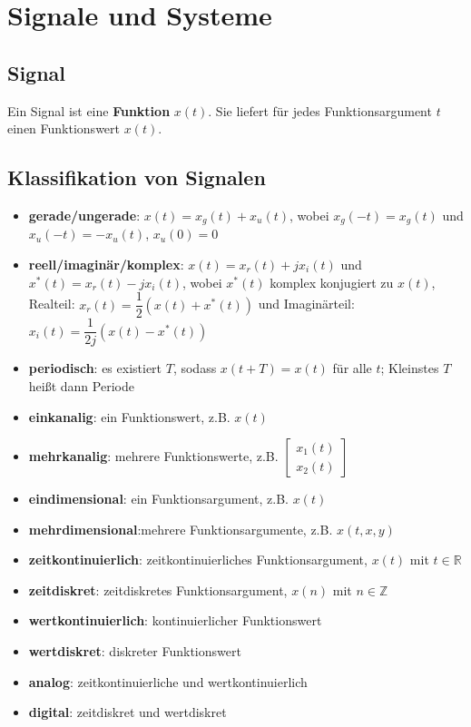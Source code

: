 \documentclass[10pt,a4paper]{article}
\author{Florian Euchner, Stefan Köbel, Chong Shen, Jan Frederik Dick}
\newcommand{\fancythumb}[2]{
	\addthumb{#1}{\large\sffamily\textbf{\space\space#1\vspace{5pt}}}{white}{#2}
}
\begin{document}
\section*{Signale und Systeme}
\fancythumb{S\&S}{teal}
\subsection*{Signal}
Ein Signal ist eine \textbf{Funktion} $x(t)$. Sie liefert für jedes Funktionsargument $t$ einen Funktionswert $x(t)$.
\subsection*{Klassifikation von Signalen}
\begin{itemize}
	\item \textbf{gerade/ungerade}: $x(t)=x_g(t)+x_u(t)$, wobei $x_g(-t)=x_g(t)$ und $x_u(-t)=-x_u(t)$, $x_u(0)=0$
	\item \textbf{reell/imaginär/komplex}: $x(t)=x_r(t)+jx_i(t)$ und $x^*(t)=x_r(t)-jx_i(t)$, wobei $x^*(t)$ komplex konjugiert zu $x(t)$, Realteil: $x_r(t)=\dfrac{1}{2}(x(t)+x^*(t))$ und Imaginärteil: $x_i(t)=\dfrac{1}{2j}(x(t)-x^*(t))$ 
	\item \textbf{periodisch}: es existiert $T$, sodass $x(t+T)=x(t)$ für alle $t$; Kleinstes $T$ heißt dann Periode
	\item \textbf{einkanalig}: ein Funktionswert, z.B. $x(t)$
	\item \textbf{mehrkanalig}: mehrere Funktionswerte, z.B.
	$\begin{bmatrix}
		x_1(t) \\ 
		x_2(t)
	\end{bmatrix}$
	\item \textbf{eindimensional}: ein Funktionsargument, z.B. $x(t)$
	\item \textbf{mehrdimensional}:mehrere Funktionsargumente, z.B. $x(t,x,y)$
	\item \textbf{zeitkontinuierlich}: zeitkontinuierliches Funktionsargument, $x(t)$ mit $t \in \mathbb R$
	\item \textbf{zeitdiskret}: zeitdiskretes Funktionsargument, $x(n)$ mit $n \in \mathbb Z$
	\item \textbf{wertkontinuierlich}: kontinuierlicher Funktionswert
	\item \textbf{wertdiskret}: diskreter Funktionswert
	\item \textbf{analog}: zeitkontinuierliche und wertkontinuierlich
	\item \textbf{digital}: zeitdiskret und wertdiskret
\end{itemize}
\end{document}

